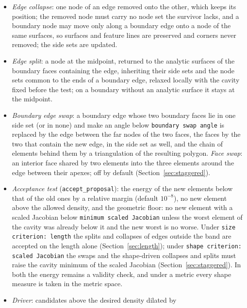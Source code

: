 \documentclass[11pt]{article}
\newcommand{\code}[1]{\texttt{#1}}
\begin{document}
\begin{itemize}[itemsep=2pt]
  the cavity (found as a face shared by four elements). A triangulation
  is valid when every triangle has the orientation of the ring polygon
  in the projection along the edge and the edge nodes lie on opposite
  sides of it.
\item \emph{Edge collapse}: one node of an edge removed onto the other,
  which keeps its position; the removed node must carry no node set the
  survivor lacks, and a boundary node may move only along a boundary
  edge onto a node of the same surfaces, so surfaces and feature lines
  are preserved and corners never removed; the side sets are updated.
\item \emph{Edge split}: a node at the midpoint, returned to the
  analytic surfaces of the boundary faces containing the edge, inheriting
  their side sets and the node sets common to the ends of a boundary
  edge, relaxed locally with the cavity fixed before the test; on a
  boundary without an analytic surface it stays at the midpoint.
\item \emph{Boundary edge swap}: a boundary edge whose two boundary
  faces lie in one side set (or in none) and make an angle below
  \code{boundary swap angle} is replaced by the edge between the far
  nodes of the two faces, the faces by the two that contain the new edge,
  in the side set as well, and the chain of elements behind them by a
  triangulation of the resulting polygon. \emph{Face swap}: an interior
  face shared by two elements into the three elements around the edge
  between their apexes; off by default (Section~\ref{sec:staggered}).
\item \emph{Acceptance test} (\code{accept\_proposal}): the energy of
  the new elements below that of the old ones by a relative margin
  (default $10^{-8}$), no new element above the allowed density, and the
  geometric floor: no new element with a scaled Jacobian below
  \code{minimum scaled Jacobian} unless the worst element of the cavity
  was already below it and the new worst is no worse. Under
  \code{size criterion: length} the splits and collapses of edges outside
  the band are accepted on the length alone (Section~\ref{sec:length});
  under \code{shape criterion: scaled Jacobian} the swaps and the
  shape-driven collapses and splits must raise the cavity minimum of the
  scaled Jacobian (Section~\ref{sec:staggered}). In both the energy
  remains a validity check, and under a metric every shape measure is
  taken in the metric space.
\item \emph{Driver}: candidates above the desired density dilated by

\end{itemize}
\end{document}
